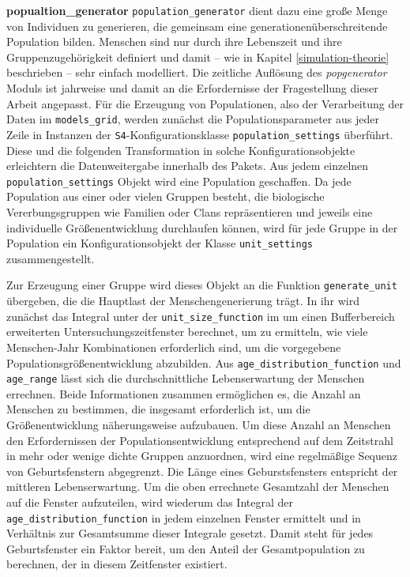 \documentclass[openany,twoside,twocolumn]{book}
\begin{document}
\textbf{popualtion\_generator} \newline 
\texttt{population\_generator} dient dazu eine große Menge von Individuen zu generieren, die gemeinsam eine generationenüberschreitende Population bilden. Menschen sind nur durch ihre Lebenszeit und ihre Gruppenzugehörigkeit definiert und damit -- wie in Kapitel \ref{simulation-theorie} beschrieben -- sehr einfach modelliert. Die zeitliche Auflösung des \emph{popgenerator} Moduls ist jahrweise und damit an die Erfordernisse der Fragestellung dieser Arbeit angepasst. Für die Erzeugung von Populationen, also der Verarbeitung der Daten im \texttt{models\_grid}, werden zunächst die Populationsparameter aus jeder Zeile in Instanzen der \texttt{S4}-Konfigurationsklasse \texttt{population\_settings} überführt. Diese und die folgenden Transformation in solche Konfigurationsobjekte erleichtern die Datenweitergabe innerhalb des Pakets. Aus jedem einzelnen \texttt{population\_settings} Objekt wird eine Population geschaffen. Da jede Population aus einer oder vielen Gruppen besteht, die biologische Vererbungsgruppen wie Familien oder Clans repräsentieren und jeweils eine individuelle Größenentwicklung durchlaufen können, wird für jede Gruppe in der Population ein Konfigurationsobjekt der Klasse \texttt{unit\_settings} zusammengestellt.

Zur Erzeugung einer Gruppe wird dieses Objekt an die Funktion \texttt{generate\_unit} übergeben, die die Hauptlast der Menschengenerierung trägt. In ihr wird zunächst das Integral unter der \texttt{unit\_size\_function} im um einen Bufferbereich erweiterten Untersuchungszeitfenster berechnet, um zu ermitteln, wie viele Menschen-Jahr Kombinationen erforderlich sind, um die vorgegebene Populationsgrößenentwicklung abzubilden. Aus \texttt{age\_distribution\_function} und \texttt{age\_range} lässt sich die durchschnittliche Lebenserwartung der Menschen errechnen. Beide Informationen zusammen ermöglichen es, die Anzahl an Menschen zu bestimmen, die insgesamt erforderlich ist, um die Größenentwicklung näherungsweise aufzubauen. Um diese Anzahl an Menschen den Erfordernissen der Populationsentwicklung entsprechend auf dem Zeitstrahl in mehr oder wenige dichte Gruppen anzuordnen, wird eine regelmäßige Sequenz von Geburtsfenstern abgegrenzt. Die Länge eines Geburstsfensters entspricht der mittleren Lebenserwartung. Um die oben errechnete Gesamtzahl der Menschen auf die Fenster aufzuteilen, wird wiederum das Integral der \texttt{age\_distribution\_function} in jedem einzelnen Fenster ermittelt und in Verhältnis zur Gesamtsumme dieser Integrale gesetzt. Damit steht für jedes Geburtsfenster ein Faktor bereit, um den Anteil der Gesamtpopulation zu berechnen, der in diesem Zeitfenster existiert.
\end{document}
